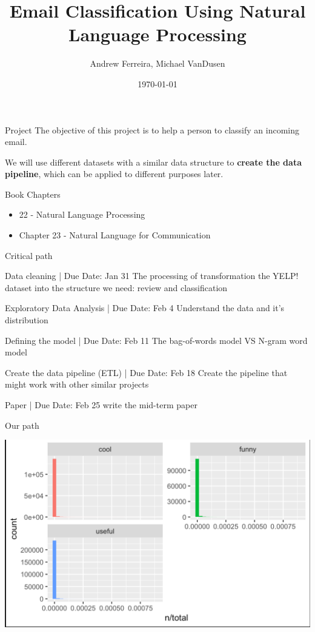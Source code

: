 \documentclass{beamer}
\title{Email Classification Using Natural Language Processing}
\author{Andrew Ferreira, Michael VanDusen}
\date{\today}
\begin{document}
\begin{frame}
    \titlepage
\end{frame}


\begin{frame}{Project}
The objective of this project is to help a person to classify an incoming email. 

We will use different datasets with a similar data structure to \textbf{create the data pipeline}, which can be applied to different purposes later. 
\end{frame}

\begin{frame}{Book Chapters}
\begin{itemize}
  \item 22 - Natural Language Processing
  \item Chapter 23 - Natural Language for Communication
\end{itemize}
\end{frame}

\begin{frame}{Critical path}

\begin{block}{Data cleaning | Due Date: Jan 31}
The processing of transformation the YELP! dataset into the structure we need:
review and classification
\end{block}

\begin{block}{Exploratory Data Analysis | Due Date: Feb 4}
Understand the data and it's distribution
\end{block}

\begin{alertblock}{Defining the model | Due Date: Feb 11}
The bag-of-words model VS N-gram word model
\end{alertblock}

\begin{block}{Create the data pipeline (ETL) | Due Date: Feb 18}
Create the pipeline that might work with other similar projects
\end{block}

\begin{block}{Paper | Due Date: Feb 25}
write the mid-term paper
\end{block}


\end{frame}

\begin{frame}{Our path}

\includegraphics[scale=0.3]{histogram}

\end{frame}
\end{document}
